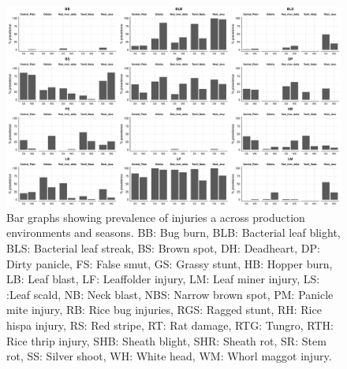     \begin{landscape}
\begin{figure}
\centering
\includegraphics[height = 1\textwidth]{figures/barplot1.pdf}
\caption{Bar graphs showing  prevalence of injuries a across production environments and seasons. BB: Bug burn, BLB: Bacterial leaf blight, BLS: Bacterial leaf streak, BS: Brown spot, DH: Deadheart, DP: Dirty panicle, FS: False smut, GS: Grassy stunt, HB: Hopper burn, LB: Leaf blast, LF: Leaffolder injury, LM: Leaf miner injury, LS: :Leaf scald, NB: Neck blast, NBS:  Narrow brown spot, PM: Panicle mite injury, RB: Rice bug injuries, RGS: Ragged stunt, RH: Rice hispa injury, RS: Red stripe, RT: Rat damage, RTG: Tungro, RTH: Rice thrip injury, SHB: Sheath blight, SHR: Sheath rot, SR: Stem rot, SS: Silver shoot, WH: White head, WM: Whorl maggot injury.}
\label{fig:barplot1}
\end{figure}    \end{landscape} 
    
